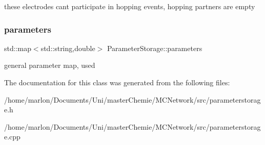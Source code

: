 these electrodes cant participate in hopping events, hopping partners are empty \mbox{\label{classParameterStorage_a3ae6709dcacaf500c8f57808a52d9be2}} 
\subsubsection{\texorpdfstring{parameters}{parameters}}
{\footnotesize\ttfamily std\+::map$<$std\+::string,double$>$ Parameter\+Storage\+::parameters}

general parameter map, used 

The documentation for this class was generated from the following files\+:\begin{DoxyCompactItemize}
\item 
/home/marlon/\+Documents/\+Uni/master\+Chemie/\+M\+C\+Network/src/parameterstorage.\+h\item 
/home/marlon/\+Documents/\+Uni/master\+Chemie/\+M\+C\+Network/src/parameterstorage.\+cpp\end{DoxyCompactItemize}
